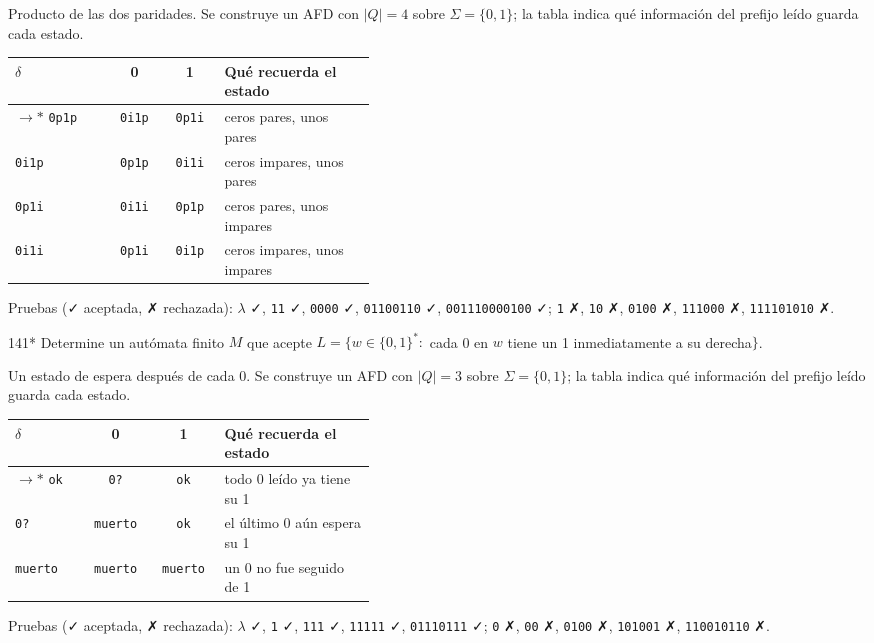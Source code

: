 \documentclass[11pt]{article}
\begin{document}
Producto de las dos paridades. Se construye un AFD con $|Q| = 4$ sobre $\Sigma = \{0, 1\}$; la tabla indica qué información del prefijo leído guarda cada estado.
\begin{center}\small\begin{tabular}{lccp{0.42\linewidth}}\toprule
$\delta$ & 0 & 1 & Qué recuerda el estado \\\midrule
$\to$$*$ \texttt{0p1p} & \texttt{0i1p} & \texttt{0p1i} & ceros pares, unos pares \\
 \texttt{0i1p} & \texttt{0p1p} & \texttt{0i1i} & ceros impares, unos pares \\
 \texttt{0p1i} & \texttt{0i1i} & \texttt{0p1p} & ceros pares, unos impares \\
 \texttt{0i1i} & \texttt{0p1i} & \texttt{0i1p} & ceros impares, unos impares \\
\bottomrule\end{tabular}\end{center}
Pruebas (✓ aceptada, ✗ rechazada): $\lambda$ ✓, \texttt{11} ✓, \texttt{0000} ✓, \texttt{01100110} ✓, \texttt{001110000100} ✓; \texttt{1} ✗, \texttt{10} ✗, \texttt{0100} ✗, \texttt{111000} ✗, \texttt{111101010} ✗.



\begin{ejercicio}{141}{*}
Determine un autómata finito $M$ que acepte $L = \{w \in \{0,1\}^* :$ cada 0 en $w$ tiene un 1 inmediatamente a su derecha$\}$.
\end{ejercicio}
\proc Un estado de espera después de cada 0. Se construye un AFD con $|Q| = 3$ sobre $\Sigma = \{0, 1\}$; la tabla indica qué información del prefijo leído guarda cada estado.
\begin{center}\small\begin{tabular}{lccp{0.42\linewidth}}\toprule
$\delta$ & 0 & 1 & Qué recuerda el estado \\\midrule
$\to$$*$ \texttt{ok} & \texttt{0?} & \texttt{ok} & todo 0 leído ya tiene su 1 \\
 \texttt{0?} & \texttt{muerto} & \texttt{ok} & el último 0 aún espera su 1 \\
 \texttt{muerto} & \texttt{muerto} & \texttt{muerto} & un 0 no fue seguido de 1 \\
\bottomrule\end{tabular}\end{center}
Pruebas (✓ aceptada, ✗ rechazada): $\lambda$ ✓, \texttt{1} ✓, \texttt{111} ✓, \texttt{11111} ✓, \texttt{01110111} ✓; \texttt{0} ✗, \texttt{00} ✗, \texttt{0100} ✗, \texttt{101001} ✗, \texttt{110010110} ✗.
\end{document}
